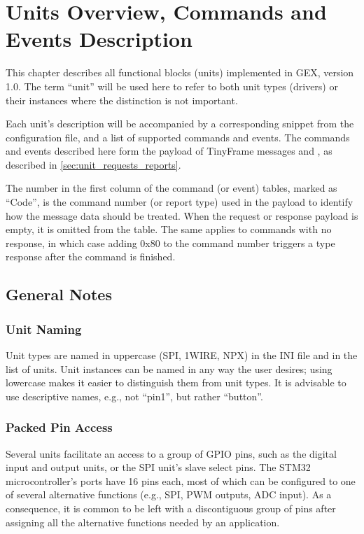 \chapter{Units Overview, Commands and Events Description} \label{sec:units_overview}

This chapter describes all functional blocks (units) implemented in GEX, version 1.0. The term ``unit'' will be used here to refer to both unit types (drivers) or their instances where the distinction is not important.

Each unit's description will be accompanied by a corresponding snippet from the configuration file, and a list of supported commands and events. The commands and events described here form the payload of TinyFrame messages \CmdUnitRequest and \CmdUnitReport, as described in \cref{sec:unit_requests_reports}.

The number in the first column of the command (or event) tables, marked as ``Code'', is the command number (or report type) used in the payload to identify how the message data should be treated. When the request or response payload is empty, it is omitted from the table. The same applies to commands with no response, in which case adding 0x80 to the command number triggers a type \CmdSuccess response after the command is finished.

\section{General Notes}

\subsection{Unit Naming}

Unit types are named in uppercase (SPI, 1WIRE, NPX) in the INI file and in the list of units. Unit instances can be named in any way the user desires; using lowercase makes it easier to distinguish them from unit types. It is advisable to use descriptive names, e.g., not ``pin1'', but rather ``button''.

\subsection{Packed Pin Access} \label{sec:packedpins}

Several units facilitate an access to a group of GPIO pins, such as the digital input and output units, or the SPI unit's slave select pins. The STM32 microcontroller's ports have 16 pins each, most of which can be configured to one of several alternative functions (e.g., SPI, PWM outputs, ADC input). As a consequence, it is common to be left with a discontiguous group of pins after assigning all the alternative functions needed by an application.

